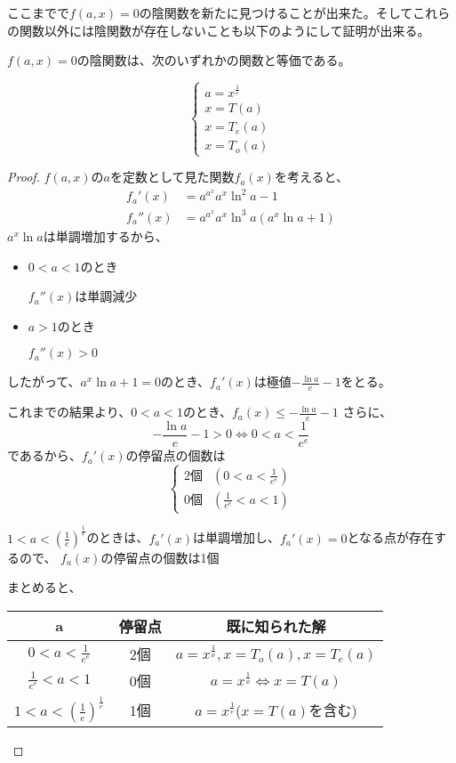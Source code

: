 	ここまでで$f(a,x)=0$の陰関数を新たに見つけることが出来た。そしてこれらの関数以外には陰関数が存在しないことも以下のようにして証明が出来る。
	\begin{theorem}
	\label{th:all_implicit_function}
		$f(a,x)=0$の陰関数は、次のいずれかの関数と等価である。
		
		\[
		\left \{
			\begin{array}{l}
				a = x^{\frac{1}{e}} \\
				x = T(a) \\
				x = T_e(a) \\
				x = T_o(a)
			\end{array}
		\right.
		\]
	\end{theorem}
	\begin{proof}
		$f(a,x)$の$a$を定数として見た関数$f_a(x)$を考えると、
		\begin{align*}
			f_a'(x) &= {a^{a^x}}{a^x}{\ln^2 a} - 1 \\
			f_a''(x)&= {a^{a^x}}{a^x}{\ln^3 a}(a^x\ln a + 1)
		\end{align*}
		$a^x\ln a$は単調増加するから、
		
		\begin{itemize}
			\item $0 < a < 1$のとき
			
				$f_a''(x)$は単調減少
			\item $a > 1$のとき
			
				$f_a''(x) > 0$
		\end{itemize}
		したがって、$a^x\ln a + 1 = 0$のとき、$f_a'(x)$は極値$-\frac{\ln a}{e} - 1$をとる。
		
		これまでの結果より、$0 < a < 1$のとき、$f_a(x) \leq -\frac{\ln a}{e} - 1$
		さらに、
		\[
			 -\frac{\ln a}{e} - 1 > 0 
			 \iff 0 < a < \frac{1}{e^e}
		\]
		であるから、$f_a'(x)$の停留点の個数は
		\[
			\begin{cases}
				\text{2個} & (0 < a < \frac{1}{e^e}) \\
				\text{0個} & (\frac{1}{e^e} < a < 1)
			\end{cases}
		\]
		
		$1 < a < \left ( \frac{1}{e} \right )^{\frac{1}{e}}$のときは、$f_a'(x)$は単調増加し、$f_a'(x)=0$となる点が存在するので、
		$f_a(x)$の停留点の個数は1個
		
		まとめると、
		\begin{table}[hbtp]
		\begin{center}
		\begin{tabular}{ccc}
			a & 停留点 & 既に知られた解 \\
			\hline
			$0 < a < \frac{1}{e^e}$ & 2個 & $a = x^{\frac{1}{x}},x = T_o(a),x = T_e(a)$ \\
			$\frac{1}{e^e} < a < 1$ & 0個 & $a = x^{\frac{1}{x}} \iff x = T(a)$ \\
			$1 < a < \left ( \frac{1}{e} \right )^{\frac{1}{e}}$ & 1個 & $a = x^{\frac{1}{e}}$($x = T(a)$を含む)
		\end{tabular}
		\end{center}
		\end{table}
		

\end{proof}
